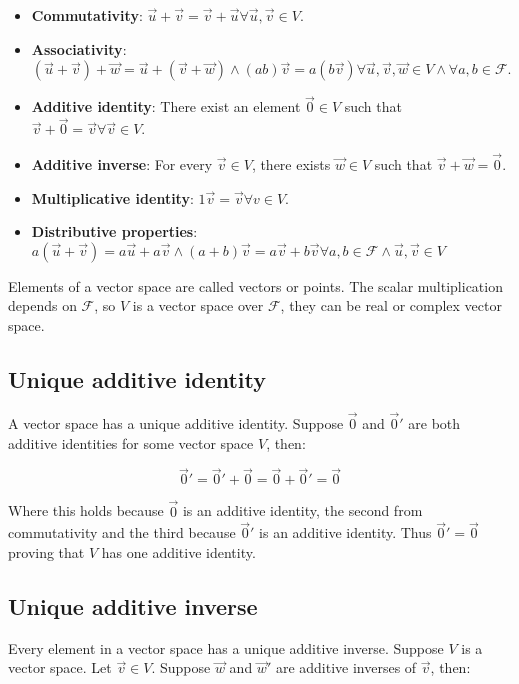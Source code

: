 \begin{multicols}{2}
  \begin{itemize}
    \item\textbf{Commutativity}: $\vec{u}+\vec{v} = \vec{v}+\vec{u}\forall\vec{u},\vec{v}\in V$.
    \item\textbf{Associativity}: $(\vec{u} + \vec{v} ) + \vec{w} = \vec{u} + (\vec{v} + \vec{w})\land (ab)\vec{v} = a(b\vec{v})\forall \vec{u}, \vec{v},\vec{w}\in V\land \forall a,b\in\mathcal{F}$.
    \item\textbf{Additive identity}: There exist an element $\vec{0}\in V$ such that $\vec{v} + \vec{0} = \vec{v}\forall\vec{v}\in V$.
    \item\textbf{Additive inverse}: For every $\vec{v}\in V$, there exists $\vec{w}\in V$ such that $\vec{v}+\vec{w} = \vec{0}$.
    \item\textbf{Multiplicative identity}: $1\vec{v} = \vec{v}\forall v\in V$.
    \item\textbf{Distributive properties}: $a(\vec{u}+\vec{v}) = a\vec{u}+a\vec{v}\land(a+b)\vec{v} = a\vec{v} + b\vec{v}\forall a,b\in\mathcal{F}\land\vec{u},\vec{v}\in V$
  \end{itemize}
\end{multicols}

Elements of a vector space are called vectors or points.
The scalar multiplication depends on $\mathcal{F}$, so $V$ is a vector space over $\mathcal{F}$, they can be real or complex vector space.\\

  \subsection{Unique additive identity}
  A vector space has a unique additive identity.
  Suppose $\vec{0}$ and $\vec{0}'$ are both additive identities for some vector space $V$, then:

  $$\vec{0}' = \vec{0}'+ \vec{0} = \vec{0} + \vec{0}' = \vec{0}$$

  Where this holds because $\vec{0}$ is an additive identity, the second from commutativity and the third because $\vec{0}'$ is an additive identity.
  Thus $\vec{0}' = \vec{0}$ proving that $V$ has one additive identity.

  \subsection{Unique additive inverse}
  Every element in a vector space has a unique additive inverse.
  Suppose $V$ is a vector space.
  Let $\vec{v}\in V$.
  Suppose $\vec{w}$ and $\vec{w}'$ are additive inverses of $\vec{v}$, then:

